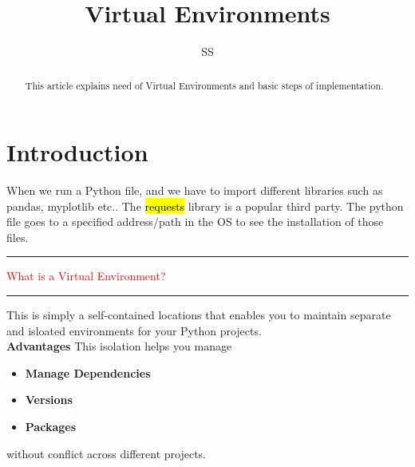 \documentclass{article}
\title{Virtual Environments}
\author{SS}
\begin{document}
\maketitle

\begin{abstract}
This article explains need of Virtual Environments and basic steps of implementation.
\end{abstract}

\section{Introduction}
When we run a Python file, and we have to import different libraries such as pandas, myplotlib etc.. The \hl{requests} library is a popular third party. The python file goes to a specified address/path in the OS to see the installation of those files.  \\
% 
\noindent
{\color{red} \rule{\linewidth}{0.5mm}}
\textcolor{red}{What is a Virtual Environment?} \\
\noindent
{\color{red} \rule{\linewidth}{0.5mm}}
This is simply a self-contained locations that enables you to maintain separate and isloated environments for your Python projects.  
\\
\textbf{Advantages} This isolation helps you manage
\begin{itemize}
\color{blue}
\item \textbf{Manage Dependencies}
\item \textbf{Versions}
\item \textbf{Packages}
\end{itemize}
without conflict across different projects.
\\
\end{document}
